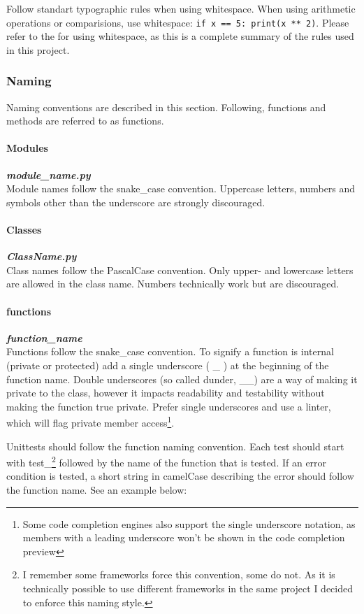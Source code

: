 Follow standart typographic rules when using whitespace. When using arithmetic
operations or comparisions, use whitespace: \verb|if x == 5: print(x ** 2)|. 
Please refer to the \RefGoogleStyle{} for using whitespace, as this
is a complete summary of the rules used in this project.


\subsubsection{Naming}
Naming conventions are described in this section. Following, functions and
methods are referred to as functions. 


\paragraph{Modules} \textbf{\textit{module\_name.py}} \\
Module names follow the snake\_case convention. Uppercase letters, numbers and
symbols other than the underscore are strongly discouraged.

\paragraph{Classes} \textbf{\textit{ClassName.py}}  \\
Class names follow the PascalCase convention. Only upper- and lowercase letters
are allowed in the class name. Numbers technically work but are discouraged.

\paragraph{functions} \textbf{\textit{function\_name}} \\
Functions follow the snake\_case convention. To signify a function is internal
(private or protected) add a single underscore ( \_ ) at the beginning of the
function name. Double underscores (so called {\glqq dunder\grqq}, \_\_) are a
way of making it private to the class, however it impacts readability and
testability without making the function {\glqq true private\grqq}. Prefer
single underscores and use a linter, which will flag private member
access\footnote{Some code completion engines also support the single underscore
notation, as members with a leading underscore won't be shown in the code
completion preview}.

Unittests should follow the function naming convention. Each test should start
with {\glqq test\_\grqq}\footnote{I remember some frameworks force this
convention, some do not. As it is technically possible to use different
frameworks in the same project I decided to enforce this naming style.}
followed by the name of the function that is tested. If an error condition is
tested, a short string in camelCase describing the error should follow the
function name. See an example below:

